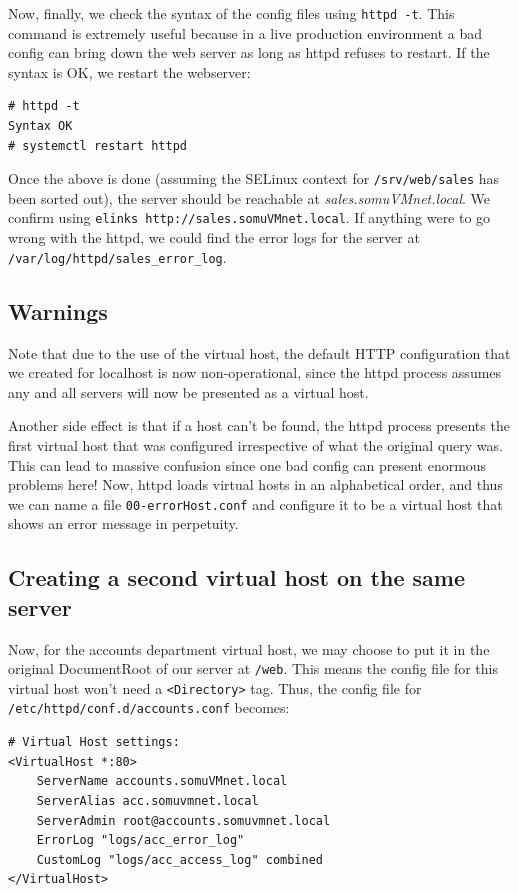 \noindent
Now, finally, we check the syntax of the config files using \verb|httpd -t|. This command is extremely useful because in a live production environment a bad config can bring down the web server as long as httpd refuses to restart. If the syntax is OK, we restart the webserver:

\vspace{-15pt}
\begin{verbatim}
# httpd -t
Syntax OK
# systemctl restart httpd
\end{verbatim}
\vspace{-10pt}	

\noindent	
Once the above is done (assuming the SELinux context for \verb|/srv/web/sales| has been sorted out), the server should be reachable at \textit{sales.somuVMnet.local}. We confirm using \verb|elinks http://sales.somuVMnet.local|. If anything were to go wrong with the httpd, we could find the error logs for the server at \verb|/var/log/httpd/sales_error_log|. 

\subsection{Warnings}
Note that due to the use of the virtual host, the default HTTP configuration that we created for localhost is now non-operational, since the httpd process assumes any and all servers will now be presented as a virtual host.

Another side effect is that if a host can't be found, the httpd process presents the first virtual host that was configured irrespective of what the original query was. This can lead to massive confusion since one bad config can present enormous problems here! Now, httpd loads virtual hosts in an alphabetical order, and thus we can name a file \verb|00-errorHost.conf| and configure it to be a virtual host that shows an error message in perpetuity. 

\subsection{Creating a second virtual host on the same server}
Now, for the accounts department virtual host, we may choose to put it in the original DocumentRoot of our server at \verb|/web|. This means the config file for this virtual host won't need a \verb|<Directory>| tag. Thus, the config file for \verb|/etc/httpd/conf.d/accounts.conf| becomes:

\vspace{-15pt}
\begin{verbatim}
# Virtual Host settings:
<VirtualHost *:80>
	ServerName accounts.somuVMnet.local
	ServerAlias acc.somuvmnet.local
	ServerAdmin root@accounts.somuvmnet.local			
	ErrorLog "logs/acc_error_log"
	CustomLog "logs/acc_access_log" combined
</VirtualHost>
\end{verbatim}
\vspace{-10pt}	

